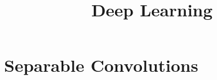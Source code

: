 





\newcommand{\titlefigure}{plots/05_conv_variations/separable/Depthwise.png}
\newcommand{\learninggoals}{
  \item Separable Convolutions
  \item Flattening
}

\title{Deep Learning}
\date{}








\section{Separable Convolutions}

